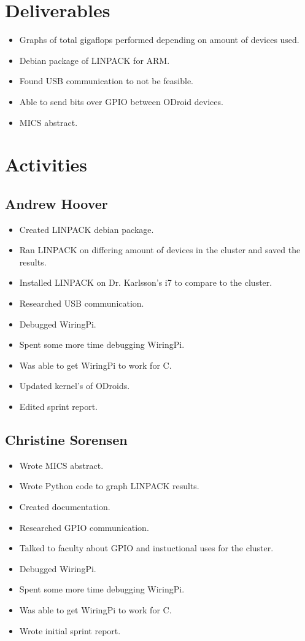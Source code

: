 \documentclass{article}
\begin{document}
\section*{Deliverables}
\begin{itemize}
	\item Graphs of total gigaflops performed depending on amount of devices used.
	\item Debian package of LINPACK for ARM.
	\item Found USB communication to not be feasible.
	\item Able to send bits over GPIO between ODroid devices.
	\item MICS abstract.
\end{itemize}

\section*{Activities}

\subsection*{Andrew Hoover}
\begin{itemize}
	\item Created LINPACK debian package.
	\item Ran LINPACK on differing amount of devices in the cluster and saved the results.
	\item Installed LINPACK on Dr. Karlsson's i7 to compare to the cluster.
	\item Researched USB communication.
	\item Debugged WiringPi.
	\item Spent some more time debugging WiringPi.
	\item Was able to get WiringPi to work for C.
	\item Updated kernel's of ODroids.
	\item Edited sprint report.
\end{itemize}
\subsection*{Christine Sorensen}
\begin{itemize}
	\item Wrote MICS abstract.
	\item Wrote Python code to graph LINPACK results.
	\item Created documentation.
	\item Researched GPIO communication.
	\item Talked to faculty about GPIO and instuctional uses for the cluster.
	\item Debugged WiringPi.
	\item Spent some more time debugging WiringPi.
	\item Was able to get WiringPi to work for C.
	\item Wrote initial sprint report.
\end{itemize}
\end{document}
